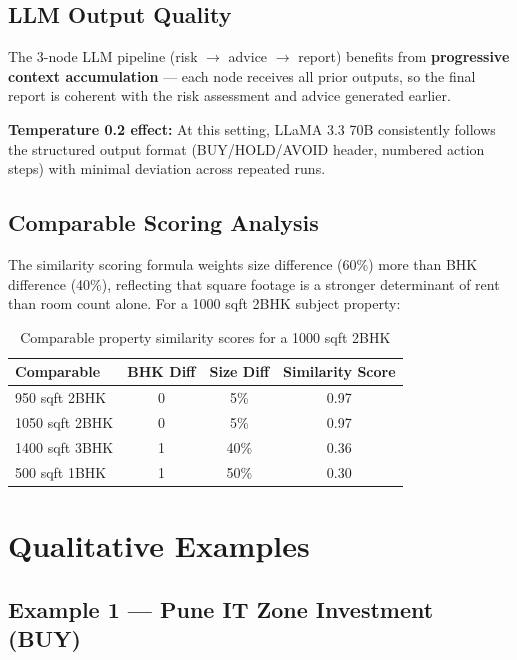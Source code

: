 \documentclass[12pt,a4paper]{article}
\begin{document}
\subsection{LLM Output Quality}

The 3-node LLM pipeline (risk $\rightarrow$ advice $\rightarrow$ report) benefits from \textbf{progressive context accumulation} --- each node receives all prior outputs, so the final report is coherent with the risk assessment and advice generated earlier.

\textbf{Temperature 0.2 effect:} At this setting, LLaMA 3.3 70B consistently follows the structured output format (BUY/HOLD/AVOID header, numbered action steps) with minimal deviation across repeated runs.

\subsection{Comparable Scoring Analysis}

The similarity scoring formula weights size difference (60\%) more than BHK difference (40\%), reflecting that square footage is a stronger determinant of rent than room count alone. For a 1000 sqft 2BHK subject property:

\begin{table}[H]
\centering
\caption{Comparable property similarity scores for a 1000 sqft 2BHK}
\begin{tabular}{lccc}
\toprule
\textbf{Comparable} & \textbf{BHK Diff} & \textbf{Size Diff} & \textbf{Similarity Score} \\
\midrule
950 sqft 2BHK  & 0 & 5\%  & 0.97 \\
1050 sqft 2BHK & 0 & 5\%  & 0.97 \\
1400 sqft 3BHK & 1 & 40\% & 0.36 \\
500 sqft 1BHK  & 1 & 50\% & 0.30 \\
\bottomrule
\end{tabular}
\end{table}

\section{Qualitative Examples}

\subsection{Example 1 --- Pune IT Zone Investment (\textcolor{green!60!black}{BUY})}
\end{document}
